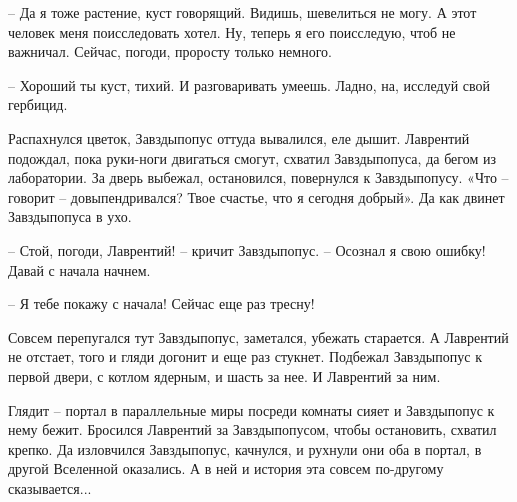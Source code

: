 \documentclass[ebook,oneside,final,openright]{memoir}
\begin{document}
– Да я тоже растение, куст говорящий. Видишь, шевелиться не могу. А этот человек меня поисследовать хотел. Ну, теперь я его поисследую, чтоб не важничал. Сейчас, погоди, проросту только немного.\par
– Хороший ты куст, тихий. И разговаривать умеешь. Ладно, на, исследуй свой гербицид.\par
\par
Распахнулся цветок, Завздыпопус оттуда вывалился, еле дышит. Лаврентий подождал, пока руки-ноги двигаться смогут, схватил Завздыпопуса, да бегом из лаборатории. За дверь выбежал, остановился, повернулся к Завздыпопусу. «Что – говорит – довыпендривался? Твое счастье, что я сегодня добрый». Да как двинет Завздыпопуса в ухо.\par
\par
– Стой, погоди, Лаврентий! – кричит Завздыпопус. – Осознал я свою ошибку! Давай с начала начнем.\par
– Я тебе покажу с начала! Сейчас еще раз тресну!\par
\par
Совсем перепугался тут Завздыпопус, заметался, убежать старается. А Лаврентий не отстает, того и гляди догонит и еще раз стукнет. Подбежал Завздыпопус к первой двери, с котлом ядерным, и шасть за нее. И Лаврентий за ним.\par
\par
Глядит – портал в параллельные миры посреди комнаты сияет и Завздыпопус к нему бежит. Бросился Лаврентий за Завздыпопусом, чтобы остановить, схватил крепко. Да изловчился Завздыпопус, качнулся, и рухнули они оба в портал, в другой Вселенной оказались. А в ней и история эта совсем по-другому сказывается...\par
\end{document}
